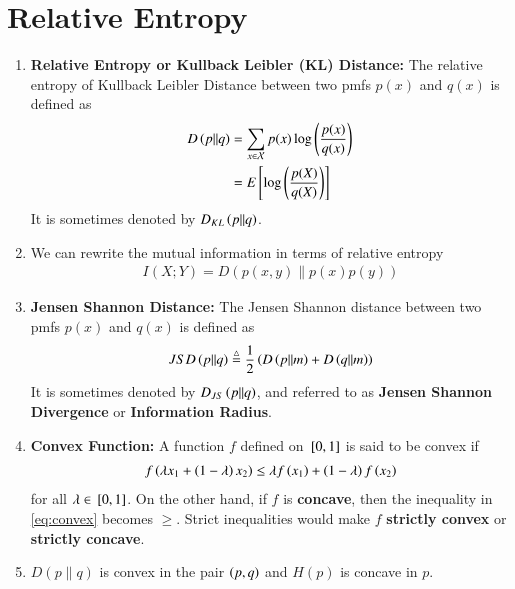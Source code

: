 \documentclass[journal,12pt,twocolumn]{IEEEtran}
\renewcommand\thesection{\arabic{section}}
\begin{document}
\section{Relative Entropy}
\begin{enumerate}[label=\thesection.\arabic*, ref=\thesection.\theenumi]
    \item \textbf{Relative Entropy or Kullback Leibler (KL) Distance:} The 
    relative entropy of Kullback Leibler Distance between two pmfs $p(x)$ 
    and $q(x)$ is defined as 
    \begin{align}
        D\left(p\|q\right) &= \sum_{x\in\mathcal{X}}p(x)\log\left(\frac{p(x)}{q(x)}\right) \label{eq:dkl-1} \\
        &= E{}\left[\log\left(\frac{p(X)}{q(X)}\right)\right] \label{eq:dkl-2}
    \end{align}
    It is sometimes denoted by $D_{KL}\left(p\|q\right)$.
    \item We can rewrite the mutual information in terms of relative entropy 
    \begin{align}
        I(X;Y) = D(p(x,y)\|p(x)p(y)) \label{eq:mutual-info-dkl}
    \end{align}
    \item \textbf{Jensen Shannon Distance:} The Jensen Shannon distance between 
    two pmfs $p(x)$ and $q(x)$ is defined as 
    \begin{align}
        JSD\left(p\|q\right) \stackrel{\triangle}{=} \frac{1}{2}\left(D\left(p\|m\right) + D\left(q\|m\right)\right)
        \label{eq:jsd}
    \end{align}
    It is sometimes denoted by $D_{JS}\left(p\|q\right)$, and referred to as 
    \textbf{Jensen Shannon Divergence} or \textbf{Information Radius}.
    \item \textbf{Convex Function:} A function $f$ defined on ${}\left[0,1\right]$ is 
    said to be convex if
    \begin{align}
        f\left(\lambda x_1 + \left(1 - \lambda\right)x_2\right) \le \lambda f\left(x_1\right) + \left(1-\lambda\right)f\left(x_2\right)
        \label{eq:convex}
    \end{align}
    for all $\lambda \in {}\left[0,1\right]$. On the other hand, if $f$ is \textbf{concave}, 
    then the inequality in \eqref{eq:convex} becomes $\ge$. Strict inequalities
    would make $f$ \textbf{strictly convex} or \textbf{strictly concave}.
    \item $D(p\|q)$ is convex in the pair $\left(p,q\right)$ and $H(p)$ is concave in $p$.
\end{enumerate}
\end{document}
